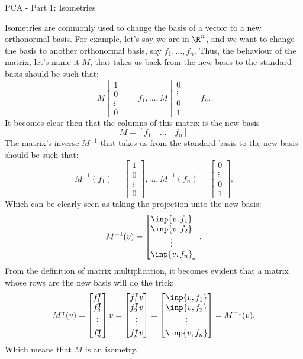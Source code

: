 \begin{entry}[2]{PCA - Part 1: Isometries }
\begin{entrysection}
\noindent Isometries are commonly used to change the basis of a vector to a new orthonormal basis. For example, let's say we are in $\R^n$, and we want to change the basis to another orthonormal basis, say 
$f_1, \ldots, f_n.$
Thus, the behaviour of the matrix, let's name it $M$, that takes us back from the new basis to the standard basis should be such that:
\[ M\begin{bmatrix}1 \\ 0 \\ \vdots \\ 0\end{bmatrix} = f_1,  \ldots,  M\begin{bmatrix}0 \\ \vdots \\ 0\\ 1\end{bmatrix} = f_n. \]
It becomes clear then that the columns of this matrix is the new basis
\[ M = [f_1 \quad \ldots \quad f_n]\] 
The matrix's inverse $M^{-1}$ that takes us from the standard basis to the new basis should be such that:
\[ M^{-1}(f_1) = \begin{bmatrix}1 \\ 0 \\ \vdots \\ 0\end{bmatrix}, \ldots,  M^{-1}(f_n) = \begin{bmatrix}0 \\ \vdots \\ 0\\ 1\end{bmatrix}. \]
Which can be clearly seen as taking the projection unto the new basis:
\[ M^{-1}(v) =  \begin{bmatrix}\inp{v, f_1}\\\inp{v, f_2}\\\vdots\\\inp{v, f_n} \end{bmatrix}.\]
From the definition of matrix multiplication, it becomes evident that a matrix whose rows are the new basis will do the trick:
\[  M^{\intercal}(v) = \begin{bmatrix} f_1^\intercal\\ f_2^\intercal\\\vdots\\ f_n^\intercal \end{bmatrix}v = \begin{bmatrix}f_1^\intercal v\\f_2^\intercal v\\\vdots\\f_n^\intercal v \end{bmatrix} = 
\begin{bmatrix}\inp{v, f_1}\\\inp{v, f_2}\\\vdots\\\inp{v, f_n} \end{bmatrix} = M^{-1}(v).\] 
Which means that $M$ is an isometry.
\end{entrysection}

\end{entry}
